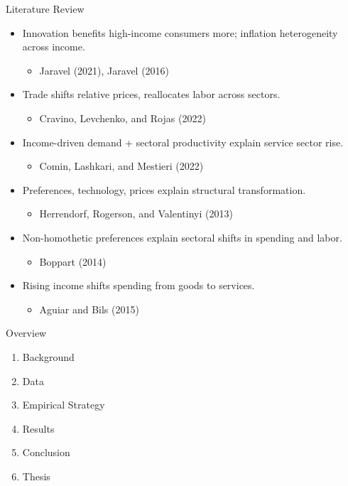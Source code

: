 \documentclass[10pt]{beamer}
\begin{document}
\begin{frame}
	{Literature Review}
	\begin{itemize}
		\item Innovation benefits high-income consumers more; inflation heterogeneity across income.
		      \begin{itemize}
			      \item Jaravel (2021), Jaravel (2016)
		      \end{itemize}

		\item Trade shifts relative prices, reallocates labor across sectors.
		      \begin{itemize}
			      \item Cravino, Levchenko, and Rojas (2022)
		      \end{itemize}

		\item Income-driven demand + sectoral productivity explain service sector rise.
		      \begin{itemize}
			      \item Comin, Lashkari, and Mestieri (2022)
		      \end{itemize}

		\item Preferences, technology, prices explain structural transformation.
		      \begin{itemize}
			      \item Herrendorf, Rogerson, and Valentinyi (2013)
		      \end{itemize}

		\item Non-homothetic preferences explain sectoral shifts in spending and labor.
		      \begin{itemize}
			      \item Boppart (2014)
		      \end{itemize}

		\item Rising income shifts spending from goods to services.
		      \begin{itemize}
			      \item Aguiar and Bils (2015)
		      \end{itemize}
	\end{itemize}
\end{frame}

\begin{frame}
	{Overview}
	\begin{enumerate}
		\item Background
		\item Data
		\item Empirical Strategy
		\item Results
		\item Conclusion
		\item Thesis
	\end{enumerate}
\end{frame}
\end{document}
